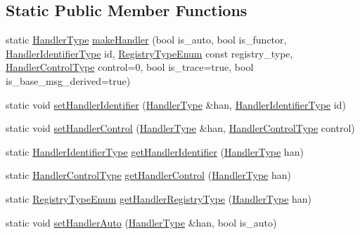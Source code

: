 \subsection*{Static Public Member Functions}
\begin{DoxyCompactItemize}
\item 
static \hyperlink{namespacevt_af64846b57dfcaf104da3ef6967917573}{Handler\+Type} \hyperlink{structvt_1_1_handler_manager_a9b5a4951cb68592ca7bfaf8b68d62549}{make\+Handler} (bool is\+\_\+auto, bool is\+\_\+functor, \hyperlink{namespacevt_a59ae068fe828d1c33051ff96f3d016b6}{Handler\+Identifier\+Type} id, \hyperlink{namespacevt_1_1auto__registry_a9f369ca2b484130b396729e2ddf05241}{Registry\+Type\+Enum} const registry\+\_\+type, \hyperlink{namespacevt_adbbef13b92f0a93b14c219b7cc8a48f2}{Handler\+Control\+Type} control=0, bool is\+\_\+trace=true, bool is\+\_\+base\+\_\+msg\+\_\+derived=true)
\item 
static void \hyperlink{structvt_1_1_handler_manager_a5501e67dbd88836fecdf434548de0909}{set\+Handler\+Identifier} (\hyperlink{namespacevt_af64846b57dfcaf104da3ef6967917573}{Handler\+Type} \&han, \hyperlink{namespacevt_a59ae068fe828d1c33051ff96f3d016b6}{Handler\+Identifier\+Type} id)
\item 
static void \hyperlink{structvt_1_1_handler_manager_a8cfa04599d2bd111f1197b7bf2343a05}{set\+Handler\+Control} (\hyperlink{namespacevt_af64846b57dfcaf104da3ef6967917573}{Handler\+Type} \&han, \hyperlink{namespacevt_adbbef13b92f0a93b14c219b7cc8a48f2}{Handler\+Control\+Type} control)
\item 
static \hyperlink{namespacevt_a59ae068fe828d1c33051ff96f3d016b6}{Handler\+Identifier\+Type} \hyperlink{structvt_1_1_handler_manager_a1fc8635a26795f11f16f47eaf74b25a7}{get\+Handler\+Identifier} (\hyperlink{namespacevt_af64846b57dfcaf104da3ef6967917573}{Handler\+Type} han)
\item 
static \hyperlink{namespacevt_adbbef13b92f0a93b14c219b7cc8a48f2}{Handler\+Control\+Type} \hyperlink{structvt_1_1_handler_manager_a90bf2b080d44af243e5a35bf8836d161}{get\+Handler\+Control} (\hyperlink{namespacevt_af64846b57dfcaf104da3ef6967917573}{Handler\+Type} han)
\item 
static \hyperlink{namespacevt_1_1auto__registry_a9f369ca2b484130b396729e2ddf05241}{Registry\+Type\+Enum} \hyperlink{structvt_1_1_handler_manager_ade4007fa07de57af7775cff18ee670e1}{get\+Handler\+Registry\+Type} (\hyperlink{namespacevt_af64846b57dfcaf104da3ef6967917573}{Handler\+Type} han)
\item 
static void \hyperlink{structvt_1_1_handler_manager_a9100f9e0e946b58d98d104a5cbcf5574}{set\+Handler\+Auto} (\hyperlink{namespacevt_af64846b57dfcaf104da3ef6967917573}{Handler\+Type} \&han, bool is\+\_\+auto)

\end{DoxyCompactItemize}
